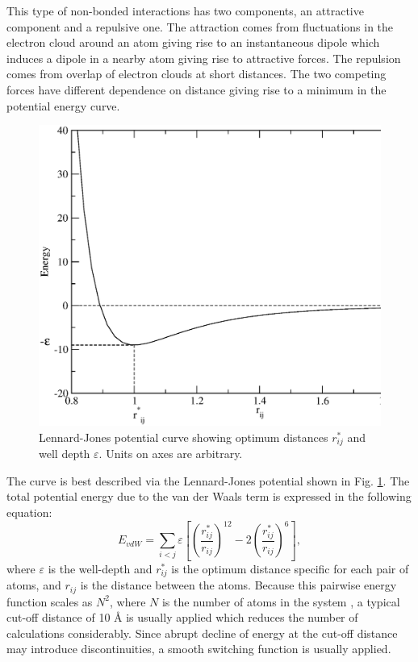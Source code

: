 \documentclass[11pt]{report}
\begin{document}
This type of non-bonded interactions has two components, an
attractive component and a repulsive one. The attraction
comes from fluctuations in the electron cloud around
an atom giving rise to an instantaneous dipole which
induces a dipole in a nearby atom giving rise to 
attractive forces. The repulsion comes from overlap
of electron clouds at short distances. The two 
competing forces have different dependence on 
distance giving rise to a minimum in
the potential energy curve. 
\begin{figure}
  \centering
  \includegraphics[width=0.7\linewidth]{images/lj.eps}
  \caption[Lennard-Jones potential]{Lennard-Jones 
  potential curve showing optimum distances $r_{ij}^{*}$ and well depth $\varepsilon$. Units on axes are arbitrary.}
  \label{f:I-LJ}
\end{figure}
The curve is best described
via the Lennard-Jones potential shown in 
Fig. \ref{f:I-LJ}. The total potential
energy due to the van der Waals term is expressed in the following equation:
\begin{equation}
E_{vdW} = \sum_{i<j} \varepsilon \left[ \left(\frac{r_{ij}^*}{r_{ij}}\right)^{12} - 2\left(\frac{r_{ij}^*}{r_{ij}}\right)^{6} \right], 
\end{equation}
where $\varepsilon$ is the well-depth and $r_{ij}^*$
is the optimum distance specific for each pair of atoms, and
$r_{ij}$ is the distance between the atoms. Because
this pairwise energy function scales as $N^2$, where $N$ is the
number of atoms in the system , a typical cut-off
distance of 10 \r{A} is usually applied which 
reduces the number of calculations considerably. Since abrupt
decline of energy at the cut-off distance may introduce
discontinuities, a smooth switching function is usually 
applied.
\end{document}
